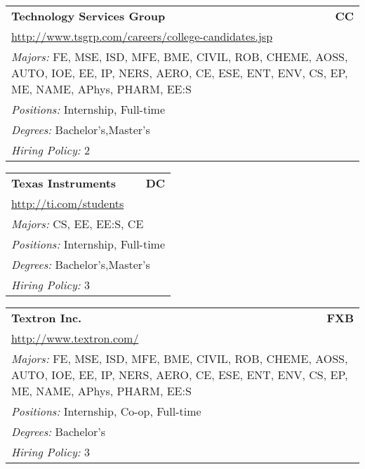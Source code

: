 \documentclass[twoside]{article}
\begin{document}
\begin{center}
\begin{multicols}{3}
\begin{FlushLeft}
\begin{minipage}{\columnwidth}\begin{tabularx}{.95\columnwidth}{Xr}
                 {\Large\bf Technology Services Group} & {\Large\bf CC}\\
    \multicolumn{2}{p{.95\columnwidth}}{\url{http://www.tsgrp.com/careers/college-candidates.jsp}}\\
    \multicolumn{2}{p{.95\columnwidth}}{\emph{Majors:} FE, MSE, ISD, MFE, BME, CIVIL, ROB, CHEME, AOSS, AUTO, IOE, EE, IP, NERS, AERO, CE, ESE, ENT, ENV, CS, EP, ME, NAME, APhys, PHARM, EE:S}\\
    \multicolumn{2}{p{.95\columnwidth}}{\emph{Positions:} Internship, Full-time}\\
    \multicolumn{2}{p{.95\columnwidth}}{\emph{Degrees:} Bachelor's,Master's}\\
    \multicolumn{2}{p{.95\columnwidth}}{\emph{Hiring Policy:} 2}\\
    \end{tabularx}
    
\end{minipage}
 
\begin{minipage}{\columnwidth}\begin{tabularx}{.95\columnwidth}{Xr}
                 {\Large\bf Texas Instruments} & {\Large\bf DC}\\
    \multicolumn{2}{p{.95\columnwidth}}{\url{http://ti.com/students}}\\
    \multicolumn{2}{p{.95\columnwidth}}{\emph{Majors:} CS, EE, EE:S, CE}\\
    \multicolumn{2}{p{.95\columnwidth}}{\emph{Positions:} Internship, Full-time}\\
    \multicolumn{2}{p{.95\columnwidth}}{\emph{Degrees:} Bachelor's,Master's}\\
    \multicolumn{2}{p{.95\columnwidth}}{\emph{Hiring Policy:} 3}\\
    \end{tabularx}
    
\end{minipage}
 
\begin{minipage}{\columnwidth}\begin{tabularx}{.95\columnwidth}{Xr}
                 {\Large\bf Textron Inc.} & {\Large\bf FXB}\\
    \multicolumn{2}{p{.95\columnwidth}}{\url{http://www.textron.com/}}\\
    \multicolumn{2}{p{.95\columnwidth}}{\emph{Majors:} FE, MSE, ISD, MFE, BME, CIVIL, ROB, CHEME, AOSS, AUTO, IOE, EE, IP, NERS, AERO, CE, ESE, ENT, ENV, CS, EP, ME, NAME, APhys, PHARM, EE:S}\\
    \multicolumn{2}{p{.95\columnwidth}}{\emph{Positions:} Internship, Co-op, Full-time}\\
    \multicolumn{2}{p{.95\columnwidth}}{\emph{Degrees:} Bachelor's}\\
    \multicolumn{2}{p{.95\columnwidth}}{\emph{Hiring Policy:} 3}\\
    \end{tabularx}
    

\end{minipage}
\end{FlushLeft}
\end{multicols}
\end{center}
\end{document}
